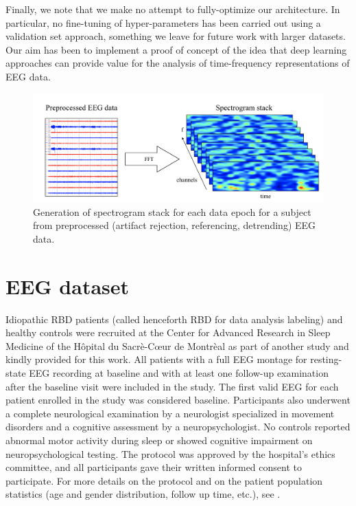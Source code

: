 \documentclass[review]{elsarticle}
\begin{document}
Finally, we note that we make no attempt to fully-optimize our architecture. In particular, no fine-tuning of hyper-parameters has been carried out using a validation set approach, something we leave for future work with larger datasets. Our aim has been to implement a proof of concept of the idea that deep learning approaches can provide value for the analysis of time-frequency representations of EEG data.


\begin{figure}
	\centering
	\includegraphics[height=5.cm]{figures/stack}
	\caption{Generation of spectrogram stack for each data epoch for a subject from preprocessed (artifact rejection, referencing, detrending) EEG data. }
	\label{fig:stack}
\end{figure}


\section{EEG dataset}


Idiopathic RBD patients (called henceforth RBD for data analysis labeling) and healthy controls were recruited at the Center for Advanced Research in Sleep Medicine of the H\^opital du Sacr\`e-C\oe ur de Montr\`eal as part of another study and kindly provided for this work. All patients with a full EEG montage for resting-state EEG recording at baseline and with at least one follow-up examination after the baseline visit were included in the study. The first valid EEG for each patient enrolled in the study was considered baseline. Participants also underwent a complete neurological examination by a neurologist specialized in movement disorders and a cognitive assessment by a neuropsychologist. No controls reported abnormal motor activity during sleep or showed cognitive impairment on neuropsychological testing. The protocol was approved by the hospital's ethics committee, and all participants gave their written informed consent to participate. For more details on the protocol and on the patient population statistics (age and gender distribution, follow up time, etc.), see \cite{Brazete:2016aa}. %
\end{document}
